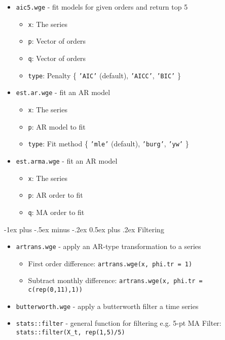 \documentclass[a4paper]{article}
\makeatletter
\renewcommand{\section}{\@startsection{section}{1}{0mm}%
	{-1ex plus -.5ex minus -.2ex}%
	{0.5ex plus .2ex}%
	{\normalfont\large\bfseries}}
\makeatother
\begin{document}
\begin{multicols}{3}
		\begin{itemize}
			\item \texttt{aic5.wge} - fit models for given orders and return top 5
				\begin{itemize}
					\item \texttt{x}: The series
					\item \texttt{p}: Vector of orders
					\item \texttt{q}: Vector of orders
					\item \texttt{type}: Penalty \{ \texttt{'AIC'} (default), \texttt{'AICC'}, \texttt{'BIC'} \}
				\end{itemize}
			\item \texttt{est.ar.wge} - fit an AR model
				\begin{itemize}
					\item \texttt{x}: The series
					\item \texttt{p}: AR model to fit
					\item \texttt{type}: Fit method \{ \texttt{'mle'} (default), \texttt{'burg'}, \texttt{'yw'} \}
				\end{itemize}
			\item \texttt{est.arma.wge} - fit an AR model
				\begin{itemize}
					\item \texttt{x}: The series
					\item \texttt{p}: AR order to fit
					\item \texttt{q}: MA order to fit
				\end{itemize}
		\end{itemize}
		
		\section{Filtering}
		
		\begin{itemize}
			\item \texttt{artrans.wge} - apply an AR-type transformation to a series
			\begin{itemize}
				\item First order difference: \texttt{artrans.wge(x, phi.tr = 1)}
				\item Subtract monthly difference: \texttt{artrans.wge(x, phi.tr = c(rep(0,11),1))}
			\end{itemize}
			\item \texttt{butterworth.wge} - apply a butterworth filter a time series
			\item \texttt{stats::filter} - general function for filtering e.g.
			5-pt MA Filter: \texttt{stats::filter(X\_t, rep(1,5)/5)}
		\end{itemize}
		
	\end{multicols}
	
\end{document}
